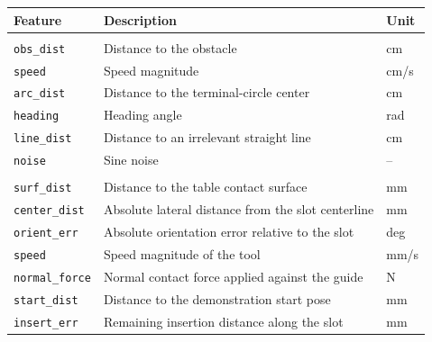 \documentclass[lettersize,journal]{IEEEtran}
\begin{document}
\begin{table}[t]
\centering
\footnotesize
\setlength{\tabcolsep}{3pt}
\renewcommand{\arraystretch}{1.05}

\begin{tabularx}{\columnwidth}{
@{}
>{\raggedright\arraybackslash}p{2.05cm}
>{\raggedright\arraybackslash}X
>{\centering\arraybackslash}p{0.75cm}
@{}
}
\toprule
Feature & Description & Unit \\
\midrule

\multicolumn{3}{@{}l}{\textbf{\texttt{S3ObsAvoid}}} \\
\addlinespace[0.1em]
\texttt{obs\_dist}
& Distance to the obstacle
& cm \\

\texttt{speed}
& Speed magnitude
& cm/s \\

\texttt{arc\_dist}
& Distance to the terminal-circle center
& cm \\

\texttt{heading}
& Heading angle
& rad \\

\texttt{line\_dist}
& Distance to an irrelevant straight line
& cm \\

\texttt{noise}
& Sine noise
& -- \\

\addlinespace[0.25em]
\midrule
\addlinespace[0.1em]

\multicolumn{3}{@{}l}{\textbf{\texttt{S4SlideInsert}}} \\
\addlinespace[0.1em]
\texttt{surf\_dist}
& Distance to the table contact surface
& mm \\

\texttt{center\_dist}
& Absolute lateral distance from the slot centerline
& mm \\

\texttt{orient\_err}
& Absolute orientation error relative to the slot
& deg \\

\texttt{speed}
& Speed magnitude of the tool
& mm/s \\

\texttt{normal\_force}
& Normal contact force applied against the guide
& N \\

\texttt{start\_dist}
& Distance to the demonstration start pose
& mm \\

\texttt{insert\_err}
& Remaining insertion distance along the slot
& mm \\


\end{tabularx}
\end{table}
\end{document}
